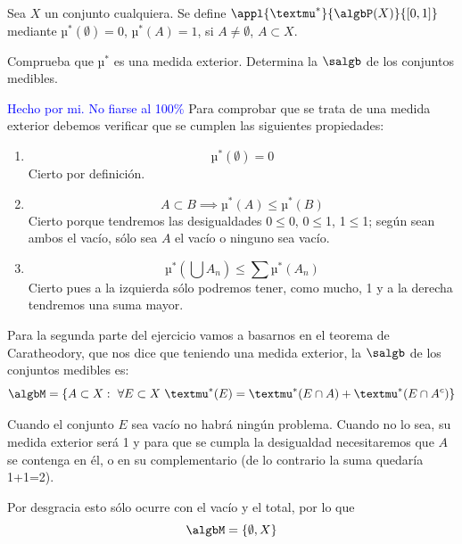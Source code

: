 \begin{problem}[12]
Sea $X$ un conjunto cualquiera. Se define $\appl{µ^*}{\algbP(X)}{[0,1]}$ mediante $µ^*(\emptyset)=0$, $µ^*(A)=1$, si $A \neq \emptyset$, $A\subset X$.

Comprueba que $µ^*$ es una medida exterior. Determina la $\salgb$ de los conjuntos medibles.

\solution
\textcolor{blue}{Hecho por mi. No fiarse al 100\%}
Para comprobar que se trata de una medida exterior debemos verificar que se cumplen las siguientes propiedades:
\begin{enumerate}
\item
\[µ^*(\emptyset)=0\]
Cierto por definición.
\item
\[A \subset B \implies µ^*(A)\leq µ^*(B)\]
Cierto porque tendremos las desigualdades 0$\leq$0, 0$\leq$1, 1$\leq$1; según sean ambos el vacío, sólo sea $A$ el vacío o ninguno sea vacío.
\item
\[µ^*(\bigcup A_n) \leq \sum µ^*(A_n)\]
Cierto pues a la izquierda sólo podremos tener, como mucho, 1 y a la derecha tendremos una suma mayor.
\end{enumerate}

Para la segunda parte del ejercicio vamos a basarnos en el teorema de Caratheodory, que nos dice que teniendo una medida exterior, la $\salgb$ de los conjuntos medibles es:
\[\algbM = \{A \subset X: \ \forall E \subset X \ µ^*(E)=µ^*(E \cap A) + µ^*(E \cap A^c)\}\]

Cuando el conjunto $E$ sea vacío no habrá ningún problema. Cuando no lo sea, su medida exterior será 1 y para que se cumpla la desigualdad necesitaremos que $A$ se contenga en él, o en su complementario (de lo contrario la suma quedaría 1+1=2).

Por desgracia esto sólo ocurre con el vacío y el total, por lo que
\[\algbM = \{\emptyset, X\}\]
\end{problem}

